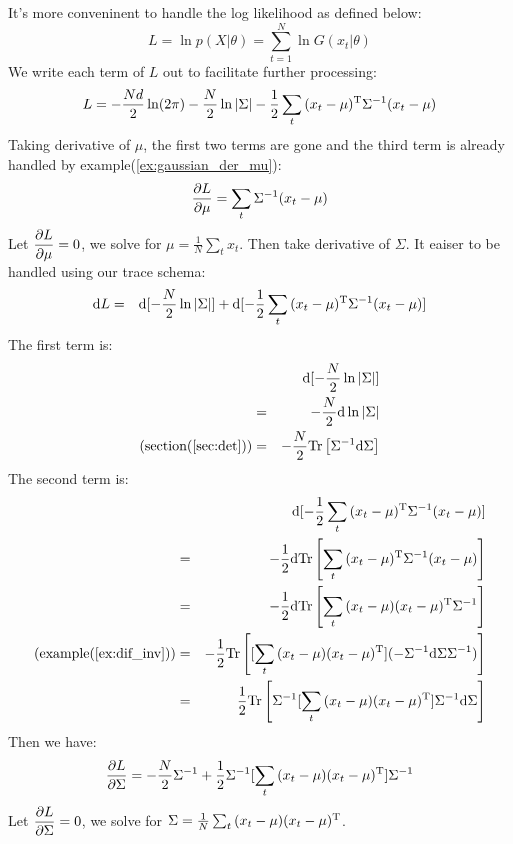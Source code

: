 It's more conveninent to handle the log likelihood as defined below:
\begin{equation}
	L = \ln p(X|\theta) = \sum_{t=1}^{N} \ln G(x_t|\theta) 
\end{equation}
We write each term of $L$ out to facilitate further processing:
\begin{equation}
	L 
	= -\frac{Nd}{2}\ln (2\pi) - \frac{N}{2}\ln |\Sigma |
	- \frac{1}{2} \sum_t {(x_t-\mu)^\mathrm{T}\Sigma^{-1}(x_t-\mu)}
\end{equation}
Taking derivative of $\mu$, the first two terms are gone and 
the third term is already handled by example(\ref{ex:gaussian_der_mu}):
\begin{equation}
	\dfrac{\partial L}{\partial \mu} = \sum_t\Sigma^{-1}(x_t-\mu)
\end{equation} 
Let $\dfrac{\partial L}{\partial \mu}=0$, we solve for $\mu = \frac{1}{N}\sum_t{x_t}$. 
Then take derivative of $\Sigma$. It eaiser to be handled using our 
trace schema:
\begin{eqnarray}
	\mathrm{d}L &=& \mathrm{d}[-\frac{N}{2}\ln |\Sigma |]+
	\mathrm{d}[- \frac{1}{2} \sum_t {(x_t-\mu)^\mathrm{T}\Sigma^{-1}(x_t-\mu)}] 
\end{eqnarray}
The first term is:
\begin{eqnarray}
	&& \mathrm{d}[-\frac{N}{2}\ln |\Sigma |] \\
	&=& -\frac{N}{2}\mathrm{d}\ln |\Sigma | \\
	\text{(section(\ref{sec:det}))}&=& -\frac{N}{2} \mathrm{Tr}\left[\Sigma^{-1}\mathrm{d}\Sigma\right] 
\end{eqnarray}
The second term is:
\begin{eqnarray}	
	&&\mathrm{d}[- \frac{1}{2} \sum_t {(x_t-\mu)^\mathrm{T}\Sigma^{-1}(x_t-\mu)}]\\	
	&=&-\frac{1}{2} \mathrm{d}\mathrm{Tr}\left[\sum_t {(x_t-\mu)^\mathrm{T}\Sigma^{-1}(x_t-\mu)}\right] \\
	&=&-\frac{1}{2} \mathrm{d}\mathrm{Tr}\left[\sum_t {(x_t-\mu)(x_t-\mu)^\mathrm{T}\Sigma^{-1}}\right] \\
	\text{(example(\ref{ex:dif_inv}))}&=& -\frac{1}{2} \mathrm{Tr}\left[[\sum_t {(x_t-\mu)(x_t-\mu)^\mathrm{T}] 
	(-\Sigma^{-1}\mathrm{d}\Sigma\Sigma^{-1})}\right] \\
	&=& \frac{1}{2} \mathrm{Tr}\left[\Sigma^{-1}[\sum_t {(x_t-\mu)(x_t-\mu)^\mathrm{T}] \Sigma^{-1}\mathrm{d}\Sigma}\right] 
\end{eqnarray}
Then we have:
\begin{equation}
	\dfrac{\partial L}{\partial \Sigma} = -\frac{N}{2}\Sigma^{-1}
	+ \frac{1}{2}\Sigma^{-1} [\sum_t {(x_t-\mu)(x_t-\mu)^\mathrm{T}}] \Sigma^{-1} 
\end{equation}
Let $\dfrac{\partial L}{\partial \Sigma}=0$, we solve for 
$\Sigma =\frac{1}{N}\sum_t {(x_t-\mu)(x_t-\mu)^\mathrm{T}} $. 

